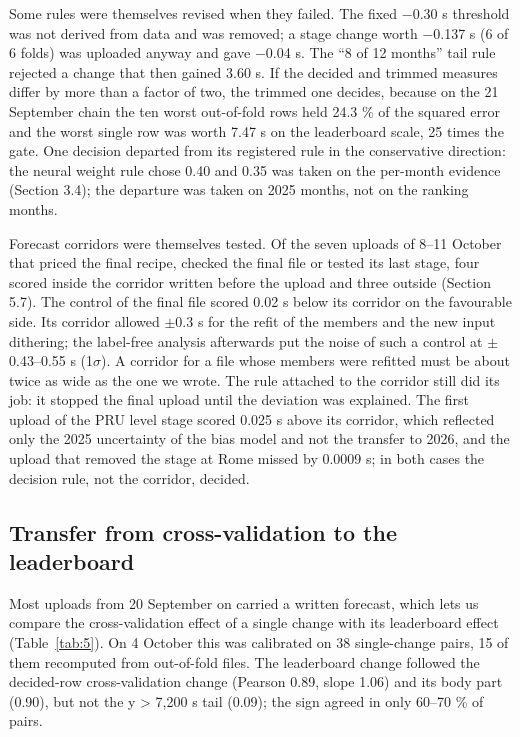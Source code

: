 \documentclass[
  manuscript=article,  %
  layout=preprint,     %
  year=2026,
  volume=4,
]{extra/joas}
\begin{document}
Some rules were themselves revised when they failed. The fixed $-$0.30 s threshold was not derived from data and was removed; a stage change worth $-$0.137 s (6 of 6 folds) was uploaded anyway and gave $-$0.04 s. The ``8 of 12 months'' tail rule rejected a change that then gained 3.60 s. If the decided and trimmed measures differ by more than a factor of two, the trimmed one decides, because on the 21 September chain the ten worst out-of-fold rows held 24.3 \% of the squared error and the worst single row was worth 7.47 s on the leaderboard scale, 25 times the gate. One decision departed from its registered rule in the conservative direction: the neural weight rule chose 0.40 and 0.35 was taken on the per-month evidence (Section 3.4); the departure was taken on 2025 months, not on the ranking months.

Forecast corridors were themselves tested. Of the seven uploads of 8--11 October that priced the final recipe, checked the final file or tested its last stage, four scored inside the corridor written before the upload and three outside (Section 5.7). The control of the final file scored 0.02 s below its corridor on the favourable side. Its corridor allowed $\pm$0.3 s for the refit of the members and the new input dithering; the label-free analysis afterwards put the noise of such a control at $\pm$0.43--0.55 s (1$\sigma$). A corridor for a file whose members were refitted must be about twice as wide as the one we wrote. The rule attached to the corridor still did its job: it stopped the final upload until the deviation was explained. The first upload of the PRU level stage scored 0.025 s above its corridor, which reflected only the 2025 uncertainty of the bias model and not the transfer to 2026, and the upload that removed the stage at Rome missed by 0.0009 s; in both cases the decision rule, not the corridor, decided.

\subsection{Transfer from cross-validation to the leaderboard}\label{transfer-from-cross-validation-to-the-leaderboard}

Most uploads from 20 September on carried a written forecast, which lets us compare the cross-validation effect of a single change with its leaderboard effect (Table~\ref{tab:5}). On 4 October this was calibrated on 38 single-change pairs, 15 of them recomputed from out-of-fold files. The leaderboard change followed the decided-row cross-validation change (Pearson 0.89, slope 1.06) and its body part (0.90), but not the y \textgreater{} 7,200 s tail (0.09); the sign agreed in only 60--70 \% of pairs.
\end{document}
